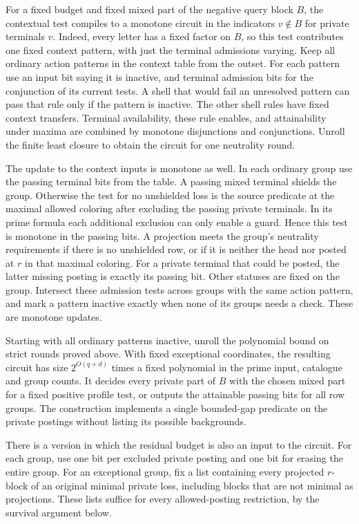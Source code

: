 For a fixed budget and fixed mixed part of the
negative query block $B$, the contextual test
compiles to a monotone circuit in the indicators
$v\notin B$ for private terminals $v$. Indeed,
every letter has a fixed factor on $B$, so this
test contributes one fixed context pattern, with
just the terminal admissions varying. Keep all
ordinary action patterns in the context table
from the outset. For each pattern use an input
bit saying it is inactive, and terminal admission
bits for the conjunction of its current tests.
A shell that would fail an unresolved pattern
can pass that rule only if the pattern is inactive.
The other shell rules have fixed context transfers.
Terminal availability, these rule enables, and
attainability under maxima are combined by
monotone disjunctions and conjunctions. Unroll
the finite least closure to obtain the circuit
for one neutrality round.

The update to the context inputs is monotone as
well. In each ordinary group use the passing
terminal bits from the table. A passing mixed
terminal shields the group. Otherwise the test
for no unshielded loss is the source predicate
at the maximal allowed coloring after excluding
the passing private terminals. In its prime
formula each additional exclusion can only
enable a guard. Hence this test is monotone in
the passing bits. A projection meets the group's
neutrality requirements if there is no unshielded
row, or if it is neither the head nor posted at
$r$ in that maximal coloring. For a private
terminal that could be posted, the latter missing
posting is exactly its passing bit. Other
statuses are fixed on the group. Intersect
these admission tests across groups with the
same action pattern, and mark a pattern inactive
exactly when none of its groups needs a check.
These are monotone updates.

Starting with all ordinary patterns inactive,
unroll the polynomial bound on strict rounds
proved above. With fixed exceptional coordinates,
the resulting circuit has size $2^{O(q+d)}$
times a fixed polynomial in the prime input,
catalogue and group counts. It decides every
private part of $B$ with the chosen mixed part
for a fixed positive profile test, or outputs
the attainable passing bits for all row groups.
The construction implements a single bounded-gap
predicate on the private postings without
listing its possible backgrounds.

There is a version in which the residual budget is
also an input to the circuit. For each group, use
one bit per excluded private posting and one bit
for erasing the entire group. For an exceptional
group, fix a list containing every projected $r$-block
of an original minimal private loss, including
blocks that are not minimal as projections. These
lists suffice for every allowed-posting restriction,
by the survival argument below.

